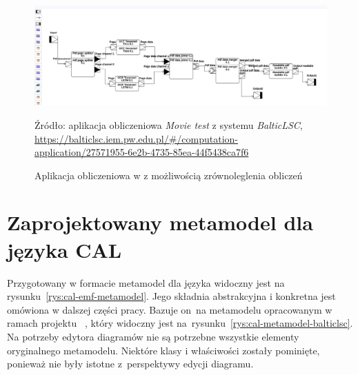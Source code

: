 \begin{figure}[!ht]
	\centering

	\includegraphics[width=0.99\linewidth]{./images/balticlsc-concurrent-application-example.png}
	\caption{Aplikacja obliczeniowa w \BalticLSC{} z możliwością
		zrównoleglenia obliczeń}\label{rys:mozliwa-do-zrownoleglenia-aplikacja-obliczeniowa}
  \medskip
  {\small Źródło: aplikacja obliczeniowa \emph{Movie test}
    z systemu \emph{BalticLSC},\\
    \url{https://balticlsc.iem.pw.edu.pl/#/computation-application/27571955-6e2b-4735-85ea-44f5438ca7f6}}
\end{figure}

\section{Zaprojektowany metamodel dla języka CAL}

Przygotowany w formacie \Ecore{} metamodel dla języka \CAL{} widoczny jest na
rysunku~\ref{rys:cal-emf-metamodel}. Jego składnia abstrakcyjna i konkretna
jest omówiona w dalszej części pracy.
Bazuje on~na metamodelu
opracowanym w ramach projektu \BalticLSC{}~\cite{cal-metamodel}, który widoczny
jest na~rysunku~\ref{rys:cal-metamodel-balticlsc}.
Na potrzeby edytora diagramów nie są potrzebne wszystkie elementy oryginalnego
metamodelu. Niektóre klasy i właściwości zostały pominięte, ponieważ nie były
istotne z~perspektywy edycji diagramu.



